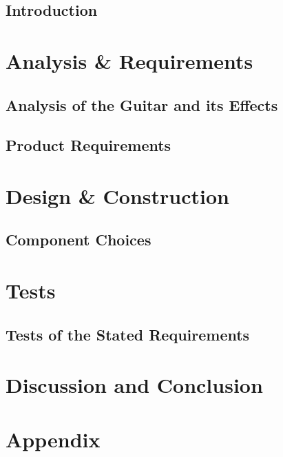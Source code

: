 \glsresetall
 \graphicspath{{figures/analysing/}}
\chapter{Introduction}

\part{Analysis \& Requirements}\label{pt:analysis} \glsresetall
 \graphicspath{{figures/analysing/}}
 \chapter{Analysis of the Guitar and its Effects}\label{ch:analysing}
% 


\chapter{Product Requirements}
%



\part{Design \& Construction}\label{pt:design} 
\graphicspath{{figures/design/}}
\chapter{Component Choices}
%


 \graphicspath{{figures/tests/}}
\part{Tests}\label{pt:tests}
\chapter{Tests of the Stated Requirements}
%


 
\part{Discussion and Conclusion}\label{pt:conclusions}
% 
%

\glsresetall
\appendix %

 \graphicspath{{figures/appendix/}}
\part{Appendix}\label{pt:appendix}
%
